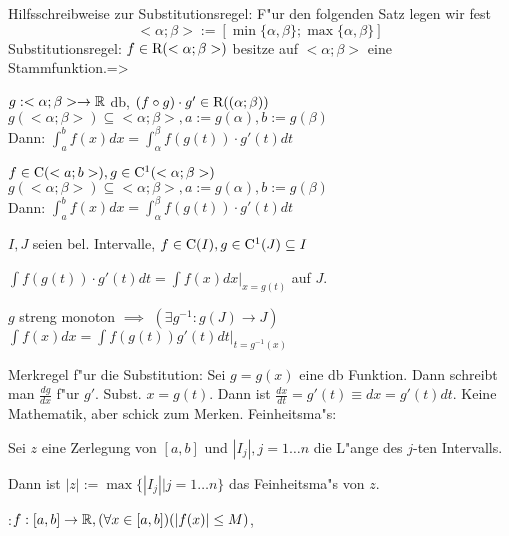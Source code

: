  Hilfsschreibweise zur Substitutionsregel:{
  F"ur den folgenden Satz legen wir fest
  \[<\alpha;\beta>:=[\min\{\alpha,\beta\};\max\{\alpha,\beta\}]
    \]
  }
\theorem Substitutionsregel:
  $f\in{\rm R}(<\alpha;\beta>)$ besitze auf $<\alpha;\beta>$ eine Stammfunktion.=>{
  \begin{stmts}
    \item $g:<\alpha;\beta>\to\mathbb R$ db, $(f\circ g)\cdot g' \in{\rm R}((\alpha;\beta))$ \\
      $g(<\alpha;\beta>)\subseteq <\alpha;\beta>,a:=g(\alpha),b:=g(\beta)$ \\
      Dann: $\displaystyle\int_a^b f(x) dx=\int_\alpha^\beta f(g(t))\cdot g'(t) dt$ 
    \item $f\in{\rm C}(<a;b>),g\in{\rm C}^1(<\alpha;\beta>)$ \\
      $g(<\alpha;\beta>)\subseteq <\alpha;\beta>,a:=g(\alpha),b:=g(\beta)$ \\
      Dann: $\displaystyle\int_a^b f(x) dx=\int_\alpha^\beta f(g(t))\cdot g'(t) dt$ 
    \item $I, J$ seien bel. Intervalle, 
      $f\in{\rm C}(I),g\in{\rm C}^1( J)\subseteq I$
    \item $\int f(g(t))\cdot g'(t) dt=\int f(x)dx|_{x=g(t)}$ auf  $J$.
    \item $g$ streng monoton $\implies$ $(\exists g^{-1}:g( J)\to  J)$\\
      $\displaystyle\int f(x)dx=\int f(g(t))g'(t) dt\big|_{t=g^{-1}(x)}$
    \end{stmts}
  }
\remark Merkregel f"ur die Substitution:{
  Sei $g=g(x)$ eine db Funktion. Dann schreibt man $\frac{dg}{dx}$ f"ur $g'$.
  Subst. $x=g(t)$. Dann ist $\frac{dx}{dt}=g'(t) \equiv dx=g'(t)dt$. 
  Keine Mathematik, aber schick zum Merken.
  }
 Feinheitsma"s:{
  Sei $z$ eine Zerlegung von $[a,b]$ und $|I_j|,j=1\ldots n$ die L"ange des
  $j$-ten Intervalls.
  
  Dann ist $|z|:=\max\{|I_j||j=1\ldots n\}$ das Feinheitsma"s von $z$.
  }
\theorem:$f:[a,b]\to\mathbb R, (\forall x\in[a,b])(|f(x)|\le M)$, 
